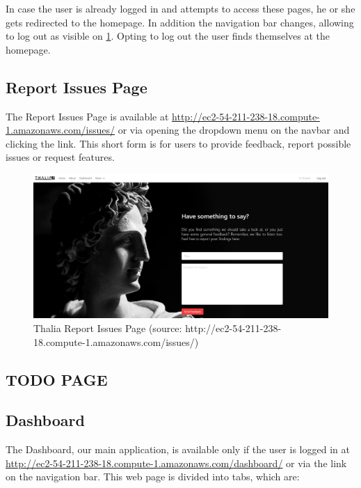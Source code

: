 \documentclass[main.tex]{subfiles}
\begin{document}
In case the user is already logged in and attempts to access these pages, he or she gets redirected to the homepage. In addition the navigation bar changes, allowing to log out as visible on \figurename{\ref{thalia_issues}}.
Opting to log out the user finds themselves at the homepage.

\subsection{Report Issues Page}

The Report Issues Page is available at \url{http://ec2-54-211-238-18.compute-1.amazonaws.com/issues/} or via opening the dropdown menu on the navbar and clicking the link. This short form is for users to provide feedback, 
report possible issues or request features.

\begin{figure}[H]
   \centering
   \includegraphics[width=\textwidth]{10Appendices/081User/081Pictures/issues.png}
   \caption{Thalia Report Issues Page (source: http://ec2-54-211-238-18.compute-1.amazonaws.com/issues/)}
   \label{thalia_issues}
\end{figure}

\subsection{TODO PAGE}

\subsection{Dashboard}

The Dashboard, our main application, is available only if the user is logged in at \url{http://ec2-54-211-238-18.compute-1.amazonaws.com/dashboard/} or via the link on the navigation bar.
This web page is divided into tabs, which are:
\end{document}

